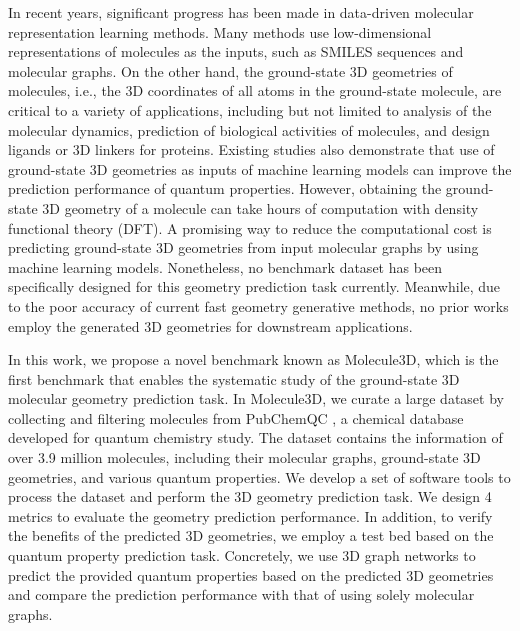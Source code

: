 \documentclass{article}
\begin{document}
In recent years, significant progress has been made in data-driven molecular representation learning methods. Many methods \cite{yang2019analyzing,stokes2020deep,wang2020advanced} use low-dimensional representations of molecules as the inputs, such as SMILES \cite{weininger1988smiles} sequences and molecular graphs. On the other hand, the ground-state 3D geometries of molecules, i.e., the 3D coordinates of all atoms in the ground-state molecule, are critical to a variety of applications, including but not limited to analysis of the molecular dynamics, prediction of biological activities of molecules, and design ligands or 3D linkers \cite{imrie2020deep, yang2020syntalinker} for proteins. Existing studies \cite{wu2018moleculenet, gilmer2017neural} also demonstrate that use of ground-state 3D geometries as inputs of machine learning models can improve the prediction performance of quantum properties. However, obtaining the ground-state 3D geometry of a molecule can take hours of computation with density functional theory (DFT). A promising way to reduce the computational cost is predicting ground-state 3D geometries from input molecular graphs by using machine learning models. Nonetheless, no benchmark dataset has been specifically designed for this geometry prediction task currently. Meanwhile, due to the poor accuracy of current fast geometry generative methods, no prior works employ the generated 3D geometries for downstream applications.

In this work, we propose a novel benchmark known as Molecule3D, which is the first benchmark that enables the systematic study of the ground-state 3D molecular geometry prediction task. In Molecule3D, we curate a large dataset by collecting and filtering molecules from PubChemQC \cite{nakata2017pubchemqc}, a chemical database developed for quantum chemistry study. The dataset contains the information of over 3.9 million molecules, including their molecular graphs, ground-state 3D geometries, and various quantum properties. We develop a set of software tools to process the dataset and perform the 3D geometry prediction task. We design 4 metrics to evaluate the geometry prediction performance. In addition, to verify the benefits of the predicted 3D geometries, we employ a test bed based on the quantum property prediction task. Concretely, we use 3D graph networks to predict the provided quantum properties based on the predicted 3D geometries and compare the prediction performance with that of using solely molecular graphs.
\end{document}
